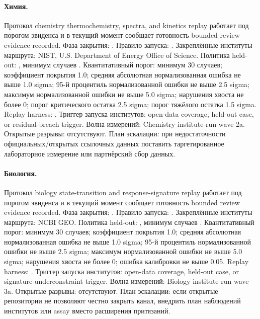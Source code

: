 \paragraph{Химия.}
Протокол chemistry thermochemistry, spectra, and kinetics replay работает под порогом эвиденса  и в текущий момент сообщает готовность bounded review evidence recorded.
Фаза закрытия: . Правило запуска: .
Закреплённые институты маршрута: NIST, \allowbreak U.S. Department of Energy Office of Science.
Политика held-out: , минимум случаев .
Квантитативный порог: минимум 30 случаев; коэффициент покрытия 1.0; средняя абсолютная нормализованная ошибка не выше 1.0 sigma; 95-й процентиль нормализованной ошибки не выше 2.5 sigma; максимум нормализованной ошибки не выше 5.0 sigma; нарушения хвоста не более 0; порог критического остатка 2.5 sigma; порог тяжёлого остатка 1.5 sigma.
Replay harness: .
Триггер запуска институтов: open-data coverage, held-out case, or residual-breach trigger. Волна измерений: Chemistry institute-run wave 2a.
Открытые разрывы: отсутствуют.
План эскалации: при недостаточности официальных/открытых ссылочных данных поставить таргетированное лабораторное измерение или партнёрский сбор данных.

\paragraph{Биология.}
Протокол biology state-transition and response-signature replay работает под порогом эвиденса  и в текущий момент сообщает готовность bounded review evidence recorded.
Фаза закрытия: . Правило запуска: .
Закреплённые институты маршрута: NCBI GEO.
Политика held-out: , минимум случаев .
Квантитативный порог: минимум 30 случаев; коэффициент покрытия 1.0; средняя абсолютная нормализованная ошибка не выше 1.0 sigma; 95-й процентиль нормализованной ошибки не выше 2.5 sigma; максимум нормализованной ошибки не выше 5.0 sigma; нарушения хвоста не более 0; ошибка калибровки не выше 0.05.
Replay harness: .
Триггер запуска институтов: open-data coverage, held-out case, or signature-underconstraint trigger. Волна измерений: Biology institute-run wave 3a.
Открытые разрывы: отсутствуют.
План эскалации: если открытые репозитории не позволяют честно закрыть канал, внедрить план наблюдений институтов или assay вместо расширения притязаний.


